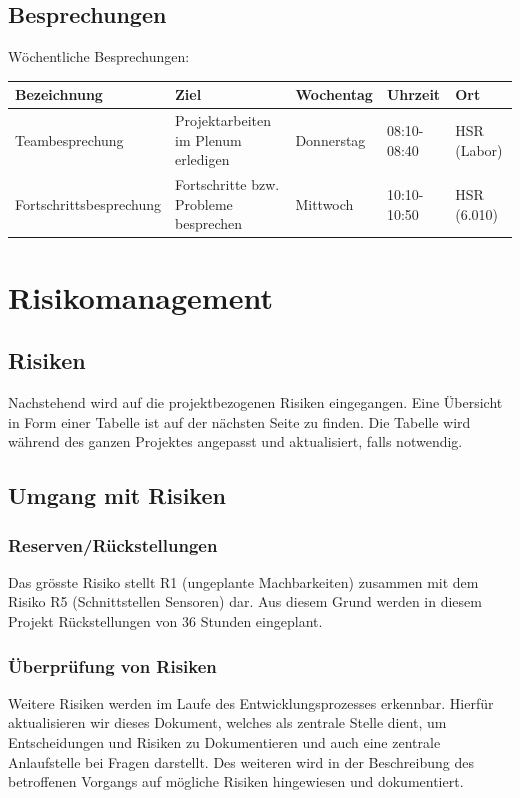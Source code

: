 \subsection*{Besprechungen}
Wöchentliche Besprechungen: \\

\begin{tabularx}{\textwidth}{lXlll}
	\textbf{Bezeichnung}	& \textbf{Ziel} & \textbf{Wochentag} & \textbf{Uhrzeit} & \textbf{Ort}\\
	\hline
	Teambesprechung			& Projektarbeiten im Plenum erledigen	& Donnerstag & 08:10-08:40	& HSR (Labor) \\ \hline
	Fortschrittsbesprechung	& Fortschritte bzw. Probleme besprechen		& Mittwoch & 10:10-10:50	& HSR (6.010) \\ \hline
\end{tabularx}
\pagebreak

\section*{Risikomanagement}
\subsection*{Risiken}
Nachstehend wird auf die projektbezogenen Risiken eingegangen. Eine Übersicht in Form einer Tabelle ist auf der nächsten Seite zu finden. Die Tabelle wird während des ganzen Projektes angepasst und aktualisiert, falls notwendig.

\subsection*{Umgang mit Risiken}
\subsubsection*{Reserven/Rückstellungen}
Das grösste Risiko stellt R1 (ungeplante Machbarkeiten) zusammen mit dem Risiko R5 (Schnittstellen Sensoren) dar. Aus diesem Grund werden in diesem Projekt Rückstellungen von 36 Stunden eingeplant.

\subsubsection*{Überprüfung von Risiken}
Weitere Risiken werden im Laufe des Entwicklungsprozesses erkennbar. Hierfür aktualisieren wir dieses Dokument, welches als zentrale Stelle dient, um Entscheidungen und Risiken zu Dokumentieren und auch eine zentrale Anlaufstelle bei Fragen darstellt. Des weiteren wird in der Beschreibung des betroffenen Vorgangs auf mögliche Risiken hingewiesen und dokumentiert.
\pagebreak
	
